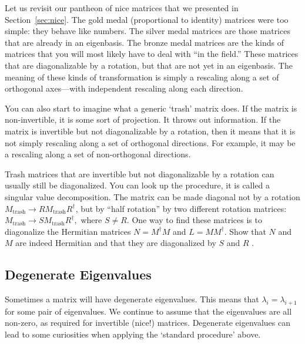 \documentclass[12pt, oneside]{report}    %
\begin{document}
\begin{bigidea}
Let us revisit our pantheon of nice matrices that we presented in Section~\ref{sec:nice}. The gold medal (proportional to identity) matrices were too simple: they behave like numbers. The silver medal matrices are those matrices that are already in an eigenbasis. The bronze medal matrices are the kinds of matrices that you will most likely have to deal with ``in the field.'' These matrices that are diagonalizable by a rotation, but that are not yet in an eigenbasis. The meaning of these kinds of transformation is simply a rescaling along a set of orthogonal axes---with independent rescaling along each direction. 

You can also start to imagine what a generic `trash' matrix does. If the matrix is non-invertible, it is some sort of projection. It throws out information. If the matrix is invertible but not diagonalizable by a rotation, then it means that it is not simply rescaling along a set of orthogonal directions. For example, it may be a rescaling along a set of non-orthogonal directions. 
\end{bigidea}

\begin{exercise}
Trash matrices that are invertible but not diagonalizable by a rotation can usually still be diagonalized. You can look up the procedure, it is called a singular value decomposition. The matrix can be made diagonal not by a rotation $M_\text{trash}\to RM_\text{trash}R^\dag$, but by ``half rotation'' by two different rotation matrices: $M_\text{trash} \to SM_\text{trash} R^\dag,$ where $S \neq R$. One way to find these matrices is to diagonalize the Hermitian matrices $N=M^\dag M$ and $L = M M^\dag$. Show that $N$ and $M$ are indeed Hermitian and that they are diagonalized by $S$ and $R$ .
\end{exercise}






\subsection{Degenerate Eigenvalues}

Sometimes a matrix will have degenerate eigenvalues. This means that $\lambda_i = \lambda_{i+1}$ for some pair of eigenvalues. We continue to assume that the eigenvalues are all non-zero, as required for invertible (nice!) matrices.  Degenerate eigenvalues can lead to some curiosities when applying the `standard procedure' above. 
\end{document}
